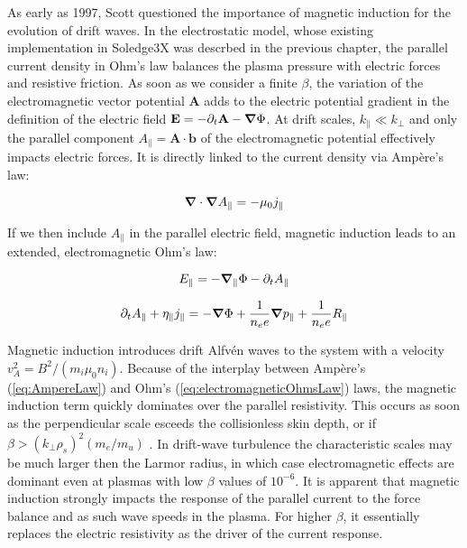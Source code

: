 As early as 1997, Scott\cite{scott1997} questioned the importance of magnetic induction for the evolution of drift waves. In the electrostatic model, whose existing implementation in Soledge3X was descrbed in the previous chapter, the parallel current density in Ohm's law balances the plasma pressure with electric forces and resistive friction. As soon as we consider a finite $\beta$, the variation of the electromagnetic vector potential $\mathbf{A}$ adds to the electric potential gradient in the definition of the electric field $ \mathbf{E} = -\partial_t \mathbf{A} - \grad \Phi$. At drift scales, $k_\parallel \ll k_\perp$ and only the parallel component $A_\parallel = \mathbf{A}\cdot\mathbf{b}$ of the electromagnetic potential effectively impacts electric forces. It is directly linked to the current density via Ampère's law: 

\begin{equation}
	\label{eq:edge_AmpereLaw}
	\grad\cdot\grad A_\parallel = -\mu_0 j_\parallel
\end{equation}

If we then include $A_\parallel$ in the parallel electric field, magnetic induction leads to an extended, electromagnetic Ohm's law:

\begin{equation}
	\label{eq:edge_EparaElectromagnetic}
	E_\parallel = -\grad_\parallel \Phi - \partial_tA_\parallel
\end{equation}


\begin{equation}
	\label{eq:edge_electromagneticOhmsLaw}
	\partial_t A_\parallel + \eta_\parallel j_\parallel = -\grad\Phi + \frac{1}{n_ee}\grad p_\parallel + \frac{1}{n_ee}R_\parallel
\end{equation}

Magnetic induction introduces drift Alfvén waves to the system with a velocity $v_A^2 = B^2/(m_i \mu_0 n_i)$. Because of the interplay between Ampère's (\ref{eq:AmpereLaw}) and Ohm's (\ref{eq:electromagneticOhmsLaw}) laws, the magnetic induction term quickly dominates over the parallel resistivity. This occurs as soon as the perpendicular scale esceeds the collisionless skin depth, or if $\beta > \left(k_\perp\rho_s\right)^2(m_e/m_u)$ \cite{mikhailovskii1963stability}. In drift-wave turbulence the characteristic scales may be much larger then the Larmor radius, in which case electromagnetic effects are dominant even at plasmas with low $\beta$ values of $10^{-6}$\cite{scott1997}. It is apparent that magnetic induction strongly impacts the response of the parallel current to the force balance and as such wave speeds in the plasma. For higher $\beta$, it essentially replaces the electric resistivity as the driver of the current response. \\ 



